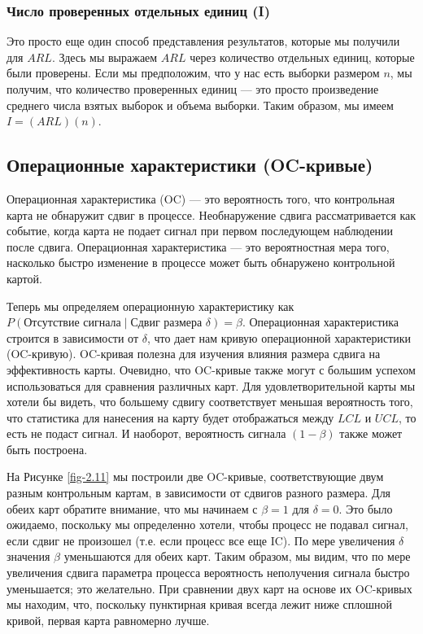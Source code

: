 \subsubsection{Число проверенных отдельных единиц (I)}

Это просто еще один способ представления результатов, которые мы получили для \(ARL\). Здесь мы выражаем \(ARL\) через количество отдельных единиц, которые были проверены. Если мы предположим, что у нас есть выборки размером \(n\), мы получим, что количество проверенных единиц — это просто произведение среднего числа взятых выборок и объема выборки. Таким образом, мы имеем \(I = (ARL)(n)\).

\subsection{Операционные характеристики (OC-кривые)}

Операционная характеристика (OC) — это вероятность того, что контрольная карта не обнаружит сдвиг в процессе. Необнаружение сдвига рассматривается как событие, когда карта не подает сигнал при первом последующем наблюдении после сдвига. Операционная характеристика — это вероятностная мера того, насколько быстро изменение в процессе может быть обнаружено контрольной картой.

Теперь мы определяем операционную характеристику как \(P(\text{Отсутствие сигнала} \mid \text{Сдвиг размера } \delta) = \beta\). Операционная характеристика строится в зависимости от \(\delta\), что дает нам кривую операционной характеристики (OC-кривую). OC-кривая полезна для изучения влияния размера сдвига на эффективность карты. Очевидно, что OC-кривые также могут с большим успехом использоваться для сравнения различных карт. Для удовлетворительной карты мы хотели бы видеть, что большему сдвигу соответствует меньшая вероятность того, что статистика для нанесения на карту будет отображаться между \(LCL\) и \(UCL\), то есть не подаст сигнал. И наоборот, вероятность сигнала \((1 - \beta)\) также может быть построена.

На Рисунке \ref{fig-2.11} мы построили две OC-кривые, соответствующие двум разным контрольным картам, в зависимости от сдвигов разного размера. Для обеих карт обратите внимание, что мы начинаем с \(\beta = 1\) для \(\delta = 0\). Это было ожидаемо, поскольку мы определенно хотели, чтобы процесс не подавал сигнал, если сдвиг не произошел (т.е. если процесс все еще IC). По мере увеличения \(\delta\) значения \(\beta\) уменьшаются для обеих карт. Таким образом, мы видим, что по мере увеличения сдвига параметра процесса вероятность неполучения сигнала быстро уменьшается; это желательно. При сравнении двух карт на основе их OC-кривых мы находим, что, поскольку пунктирная кривая всегда лежит ниже сплошной кривой, первая карта равномерно лучше.

